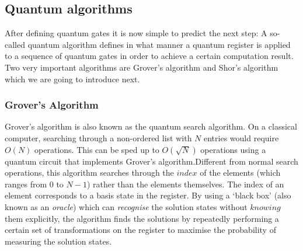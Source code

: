 \documentclass[bibliography=totocnumbered, 10pt]{article}
\theoremstyle{NoticeStyle}
\begin{document}


\subsection{Quantum algorithms}\label{sec:Quantum algorithms}

After defining quantum gates it is now simple to predict the next step: A so-called quantum algorithm defines in what manner a quantum register is applied to a sequence of quantum gates in order to achieve a certain computation result. Two very important algorithms are Grover's algorithm and Shor's algorithm which we are going to introduce next.



\subsubsection{Grover's Algorithm}
Grover's algorithm is also known as the quantum search algorithm. On a classical computer, searching through a non-ordered list with $N$ entries would require $O(N)$ operations. This can be sped up to $O(\sqrt{N})$ operations using a quantum circuit that implements Grover's algorithm.Different from normal search operations, this algorithm searches through the $index$ of the elements (which ranges from $0$ to $N-1$) rather than the elements themselves. The index of an element corresponds to a basis state in the register. By using a `black box' (also known as an \emph{oracle}) which can \emph{recognise} the solution states without $knowing$ them explicitly, the algorithm finds the solutions by repeatedly performing a certain set of transformations on the register to maximise the probability of measuring the solution states.
\end{document}
